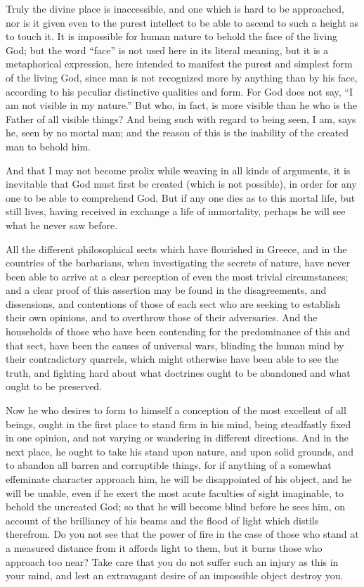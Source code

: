 Truly the divine place is inaccessible, and one which is hard to be approached, nor is it given even
to the purest intellect to be able to ascend to such a height as to touch it. It is impossible for human
nature to behold the face of the living God; but the word ``face'' is not used here in its literal
meaning, but it is a metaphorical expression, here intended to manifest the purest and simplest
form of the living God, since man is not recognized more by anything than by his face, according to
his peculiar distinctive qualities and form. For God does not say, ``I am not visible in my nature.'' But
who, in fact, is more visible than he who is the Father of all visible things? And being such with
regard to being seen, I am, says he, seen by no mortal man; and the reason of this is the inability
of the created man to behold him.

And that I may not become prolix while weaving in all kinds of arguments, it is inevitable that God
must first be created (which is not possible), in order for any one to be able to comprehend God.
But if any one dies as to this mortal life, but still lives, having received in exchange a life of
immortality, perhaps he will see what he never saw before.

All the different philosophical sects which have flourished in Greece, and in the countries of the
barbarians, when investigating the secrets of nature, have never been able to arrive at a clear
perception of even the most trivial circumstances; and a clear proof of this assertion may be found
in the disagreements, and dissensions, and contentions of those of each sect who are seeking to
establish their own opinions, and to overthrow those of their adversaries. And the households of
those who have been contending for the predominance of this and that sect, have been the causes
of universal wars, blinding the human mind by their contradictory quarrels, which might otherwise
have been able to see the truth, and fighting hard about what doctrines ought to be abandoned and
what ought to be preserved.

Now he who desires to form to himself a conception of the most excellent of all beings, ought in the
first place to stand firm in his mind, being steadfastly fixed in one opinion, and not varying or
wandering in different directions. And in the next place, he ought to take his stand upon nature, and
upon solid grounds, and to abandon all barren and corruptible things, for if anything of a somewhat
effeminate character approach him, he will be disappointed of his object, and he will be unable,
even if he exert the most acute faculties of sight imaginable, to behold the uncreated God; so that
he will become blind before he sees him, on account of the brilliancy of his beams and the flood of
light which distils therefrom. Do you not see that the power of fire in the case of those who stand at
a measured distance from it affords light to them, but it burns those who approach too near? Take
care that you do not suffer such an injury as this in your mind, and lest an extravagant desire of an
impossible object destroy you.


